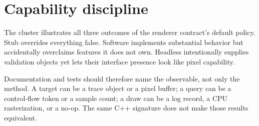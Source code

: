 \section{Capability discipline}

The cluster illustrates all three outcomes of the renderer contract's default policy.  Stub
overrides everything false.  Software implements substantial behavior but accidentally
overclaims features it does not own.  Headless intentionally supplies validation objects yet
lets their interface presence look like pixel capability.

Documentation and tests should therefore name the observable, not only the method.  A target
can be a trace object or a pixel buffer; a query can be a control-flow token or a sample count;
a draw can be a log record, a CPU rasterization, or a no-op.  The same C++ signature does not
make those results equivalent.

